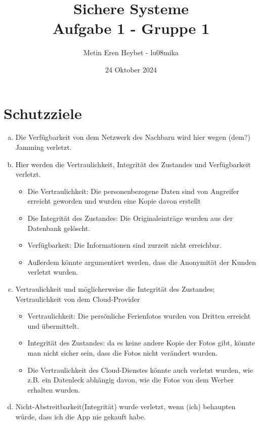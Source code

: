 \documentclass[12pt]{article}
\title{Sichere Systeme \\
Aufgabe 1 - Gruppe 1}
\author{Metin Eren Heybet - lu08mika}
\date{24 Oktober 2024}
\begin{document}
    \maketitle

    \section{Schutzziele}

    \begin{enumerate}[(a)]
        \item Die Verfügbarkeit von dem Netzwerk des Nachbarn wird hier wegen (dem?) Jamming verletzt.
        \item Hier werden die Vertraulichkeit, Integrität des Zustandes und Verfügbarkeit verletzt.
        \begin{itemize}
            \item Die Vertraulichkeit: Die personenbezogene Daten sind von Angreifer erreicht geworden und wurden eine Kopie davon erstellt 
            \item Die Integrität des Zustandes: Die Originaleinträge wurden aus der Datenbank gelöscht.
            \item Verfügbarkeit: Die Informationen sind zurzeit nicht erreichbar.
        
            \item Außerdem könnte argumentiert werden, dass die Anonymität der Kunden verletzt wurden.
        \end{itemize}

        \item Vertraulichkeit und möglicherweise die Integrität des Zustandes; Vertraulichkeit von dem Cloud-Provider 
        \begin{itemize}
            \item Vertraulichkeit: Die persönliche Ferienfotos wurden von Dritten erreicht und übermittelt.
            \item Integrität des Zustandes: da es keine andere Kopie der Fotos gibt, könnte man nicht sicher sein, dass die Fotos nicht verändert wurden.
            \item Die Vertraulichkeit des Cloud-Dienstes könnte auch verletzt wurden, wie z.B. ein Datenleck abhängig davon, wie die Fotos von dem Werber erhalten wurden. 
        \end{itemize}

        \item Nicht-Abstreitbarkeit(Integrität) wurde verletzt, wenn (ich) behaupten würde, dass ich die App nie gekauft habe.
    \end{enumerate}    
\end{document}
